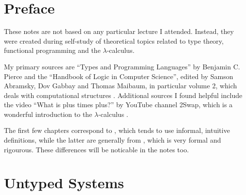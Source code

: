 \documentclass{report}
\newcommand*{\newpar}{\par\vspace{\baselineskip}\noindent}
\begin{document}
\newtheorem{lemma}{Lemma}[section]
\newtheorem{theorem}[lemma]{Theorem}

\theoremstyle{definition}
\newtheorem{definition}[lemma]{Definition}
\newtheorem{example}[lemma]{Example}
%
%
%

\tableofcontents
\thispagestyle{fancy}
%
%
%
\chapter*{Preface}
These notes are not based on any particular lecture I attended. Instead, they were created during self-study of theoretical topics related to type theory, functional programming and the $\lambda$-calculus.
\newpar
My primary sources are ``Types and Programming Languages'' by Benjamin C. Pierce \cite{types} and the ``Handbook of Logic in Computer Science'', edited by Samson Abramsky, Dov  Gabbay and Thomas Maibaum, in particular volume 2, which deals with computational structures \cite{handbookvol2}.  Additional sources I found helpful include the video ``What is plus times plus?'' by YouTube channel 2Swap, which is a wonderful introduction to the $\lambda$-calculus \cite{2swap}.
\newpar
The first few chapters correspond to \cite{types}, which tends to use informal, intuitive definitions, while the latter are generally from \cite{handbookvol2}, which is very formal and rigourous. These differences will be noticable in the notes too.
%
\chapter{Untyped Systems}
\end{document}
